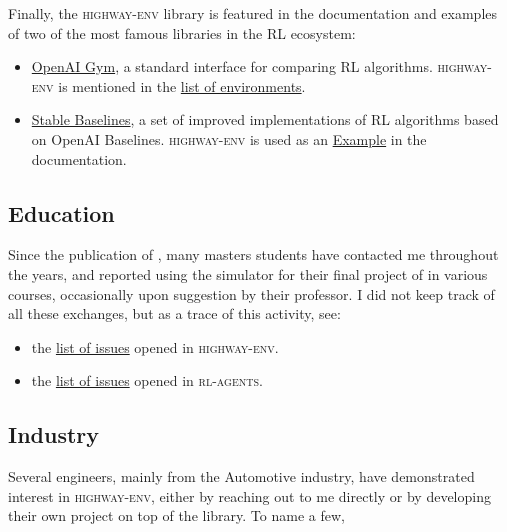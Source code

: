 \leavevmode\newline
\noindent Finally, the \textsc{highway-env} library is featured in the documentation and examples of two of the most famous libraries in the \gls{RL} ecosystem:
\begin{itemize}
\item \href{https://github.com/openai/gym}{OpenAI Gym}, a standard interface for comparing \gls{RL} algorithms. \textsc{highway-env} is mentioned in the \href{https://github.com/openai/gym/blob/master/docs/environments.md#highway-env-tactical-decision-making-for-autonomous-driving}{list of environments}.
\item \href{https://github.com/hill-a/stable-baselines}{Stable Baselines}, a set of improved implementations of \gls{RL} algorithms based on OpenAI Baselines. \textsc{highway-env} is used as an  \href{https://stable-baselines.readthedocs.io/en/master/guide/examples.html#hindsight-experience-replay-her}{Example} in the documentation.
\end{itemize}

\subsection{Education}

Since the publication of \highwayenv, many masters students have contacted me throughout the years, and reported using the simulator for their final project of in various courses, occasionally upon suggestion by their professor. %
I did not keep track of all these exchanges, but as a trace of this activity, see:
\begin{itemize}
	\item the \href{https://github.com/eleurent/highway-env/issues?q=is\%3Aissue}{list of issues} opened in \textsc{highway-env}.
	\item the \href{https://github.com/eleurent/rl-agents/issues?q=is\%3Aissue}{list of issues} opened in \textsc{rl-agents}.
\end{itemize} 

\subsection{Industry}

Several engineers, mainly from the Automotive industry, have demonstrated interest in \textsc{highway-env}, either by reaching out to me directly or by developing their own project on top of the library. To name a few,

